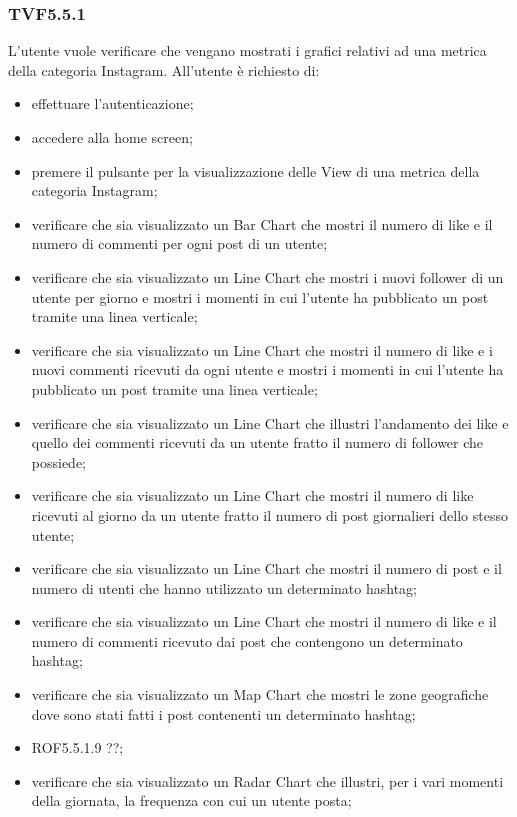		\subsubsection{TVF5.5.1}
			L'utente vuole verificare che vengano mostrati i grafici relativi ad una metrica della categoria Instagram. All'utente è richiesto di:
			\begin{itemize}
				\item effettuare l'autenticazione;
				\item accedere alla home screen;
				\item premere il pulsante per la visualizzazione delle View di una metrica della categoria Instagram;
				\item verificare che sia visualizzato un Bar Chart che mostri il numero di like e il numero di commenti per ogni post di un utente;
				\item verificare che sia visualizzato un Line Chart che mostri i nuovi follower di un utente per giorno e mostri i momenti in cui l'utente ha pubblicato un post tramite una linea verticale;
				\item verificare che sia visualizzato un Line Chart che mostri il numero di like e i nuovi commenti ricevuti da ogni utente e mostri i momenti in cui l'utente ha pubblicato un post tramite una linea verticale;
				\item verificare che sia visualizzato un Line Chart che illustri l'andamento dei like e quello dei commenti ricevuti da un utente fratto il numero di follower che possiede;
				\item verificare che sia visualizzato un Line Chart che mostri il numero di like ricevuti al giorno da un utente fratto il numero di post giornalieri dello stesso utente;
				\item verificare che sia visualizzato un Line Chart che mostri il numero di post e il numero di utenti che hanno utilizzato un determinato hashtag;
				\item verificare che sia visualizzato un Line Chart che mostri il numero di like e il numero di commenti ricevuto dai post che contengono un determinato hashtag;
				\item verificare che sia visualizzato un Map Chart che mostri le zone geografiche dove sono stati fatti i post contenenti un determinato hashtag;
				\item ROF5.5.1.9 ??;
				\item verificare che sia visualizzato un Radar Chart che illustri, per i vari momenti della giornata, la frequenza con cui un utente posta;
			\end{itemize}
			
